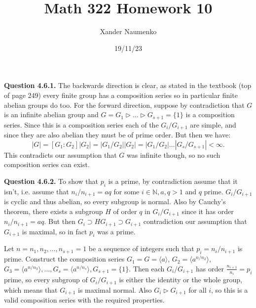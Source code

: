 \documentclass[letterpaper, reqno,11pt]{article}
\begin{document}
\title{Math 322 Homework 10}
\date{19/11/23}
\author{Xander Naumenko}
\maketitle

{\medskip\noindent\bf Question 4.6.1.}  The backwards direction is clear, as stated in the textbook (top of page 249) every finite group has a composition series so in particular finite abelian groups do too. For the forward direction, suppose by contradiction that $G$ is an infinite abelian group and $G=G_1\triangleright\ldots\triangleright G_{s+1}=\{1\}$ is a composition series. Since this is a composition series each of the $G_i/G_{i+1}$ are simple, and since they are also abelian they must be of prime order. But then we have:
\[
|G|=[G_1:G_2]|G_2|=\left| G_1 /G_{2} \right| |G_2|=\left| G_1 /G_2 \right| \ldots\left| G_s /G_{s+1} \right| <\infty
.\]
This contradicts our assumption that $G$ was infinite though, so no such composition series can exist.


{\medskip\noindent\bf Question 4.6.2.} To show that $p_i$ is a prime, by contradiction assume that it isn't, i.e. assume that $n_i /n_{i+1}=aq$ for some $i\in \mathbb{N}, a,q>1$ and $q$ prime. $G_i /G_{i+1}$ is cyclic and thus abelian, so every subgroup is normal. Also by Cauchy's theorem, there exists a subgroup $H$ of order $q$ in $G_i /G_{i+1}$ since it has order $n_i /n_{i+1}=aq$. But then $G_i\supset HG_{i+1}\supset G_{i+1}$ contradiction our assumption that $G_{i+1}$ is maximal, so in fact $p_i$ was a prime.

Let $n=n_1,n_2,\ldots,n_{s+1}=1$ be a sequence of integers such that $p_i=n_i /n_{i+1}$ is prime. Construct the composition series $G_1=G=\langle a\rangle$, $G_2=\langle a^{n/n_2}\rangle$, $G_3=\langle a^{n /n_3}\rangle, \ldots,G_s=\langle a^{n /n_s}\rangle, G_{s+1}=\{1\}$. Then each $G_i /G_{i+1}$ has order $\frac{n_{i+1}}{n_i}=p_i$ prime, so every subgroup of $G_i /G_{i+1}$ is either the identity or the whole group, which means that $G_{i+1}$ is maximal normal. Also $G_i\triangleright G_{i+1}$ for all $i$, so this is a valid composition series with the required properties.
\end{document}
